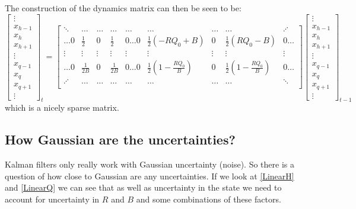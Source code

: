 \documentclass[]{article}
\begin{document}
The construction of the dynamics matrix can then be seen to be:
\begin{equation}
\begin{bmatrix}
\vdots \\
 x_{h-1} \\
 x_{h} \\
 x_{h+1} \\
 \vdots \\
  x_{q-1} \\
 x_{q} \\
 x_{q+1} \\
  \vdots
\end{bmatrix}_t
=
\begin{bmatrix}
\ddots & \dots& \dots& \dots& \dots& \dots& \dots&\dots &\iddots\\
\dots 0 & \frac{1}{2}& 0 & \frac{1}{2} & 0 \dots0&  \frac{1}{2}\left(-R Q_0 + B \right) & 0 & \frac{1}{2}\left(R Q_0 - B\right)&0\dots \\ 
\vdots & \vdots& \vdots& \vdots& \vdots& \vdots& \vdots& \vdots& \vdots\\
\dots 0 & \frac{1}{2 B} &0& \frac{1}{2 B} & 0  \dots 0  & \frac{1}{2} \left(1-\frac{R Q_0}{B} \right) & 0 & \frac{1}{2} \left(1-\frac{R Q_0}{B} \right) & 0\dots\\
\iddots & \dots& \dots& \dots& \dots& \dots& \dots &\dots &\ddots\\
\end{bmatrix}
\begin{bmatrix}
\vdots \\
 x_{h-1} \\
 x_{h} \\
 x_{h+1} \\
 \vdots \\
  x_{q-1} \\
 x_{q} \\
 x_{q+1} \\
  \vdots
\end{bmatrix}_{t-1}
\end{equation}
which is a nicely sparse matrix.

\subsection{How Gaussian are the uncertainties?}
Kalman filters only really work with Gaussian uncertainty (noise). 
So there is a question of how close to Gaussian are any uncertainties.
If we look at \eqref{LinearH} and \eqref{LinearQ} we can see that as well as uncertainty in the state we need to account for uncertainty in $R$ and $B$ and some combinations of these factors.
\end{document}
